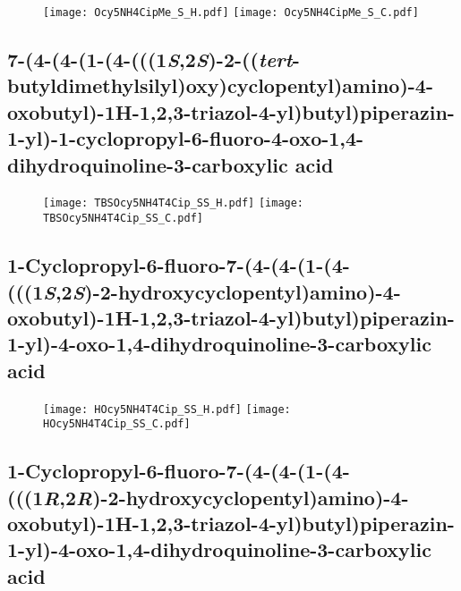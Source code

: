 \begin{figure}[H]
	\centering
		\texttt{[image: Ocy5NH4CipMe\_S\_H.pdf]}
		\texttt{[image: Ocy5NH4CipMe\_S\_C.pdf]}
\end{figure}

\subsection{7\hyp{}(4\hyp{}(4\hyp{}(1\hyp{}(4\hyp{}(((1\textit{S},2\textit{S})\hyp{}2\hyp{}((\textit{tert}\hyp{}butyldimethylsilyl)oxy)cyclopentyl)amino)\hyp{}4\hyp{}oxobutyl)\hyp{}1H\hyp{}1,2,3\hyp{}triazol\hyp{}4\hyp{}yl)butyl)piperazin\hyp{}1\hyp{}yl)\hyp{}1\hyp{}cyclopropyl\hyp{}6\hyp{}fluoro\hyp{}4\hyp{}oxo\hyp{}1,4\hyp{}dihydroquinoline\hyp{}3\hyp{}carboxylic acid }

\begin{figure}[H]
	\centering
		\texttt{[image: TBSOcy5NH4T4Cip\_SS\_H.pdf]}
		\texttt{[image: TBSOcy5NH4T4Cip\_SS\_C.pdf]}
\end{figure}

\subsection{1\hyp{}Cyclopropyl\hyp{}6\hyp{}fluoro\hyp{}7\hyp{}(4\hyp{}(4\hyp{}(1\hyp{}(4\hyp{}(((1\textit{S},2\textit{S})\hyp{}2\hyp{}hydroxycyclopentyl)amino)\hyp{}4\hyp{}oxobutyl)\hyp{}1H\hyp{}1,2,3\hyp{}triazol\hyp{}4\hyp{}yl)butyl)piperazin\hyp{}1\hyp{}yl)\hyp{}4\hyp{}oxo\hyp{}1,4\hyp{}dihydroquinoline\hyp{}3\hyp{}carboxylic acid }

\begin{figure}[H]
	\centering
		\texttt{[image: HOcy5NH4T4Cip\_SS\_H.pdf]}
		\texttt{[image: HOcy5NH4T4Cip\_SS\_C.pdf]}
\end{figure}

\subsection{1\hyp{}Cyclopropyl\hyp{}6\hyp{}fluoro\hyp{}7\hyp{}(4\hyp{}(4\hyp{}(1\hyp{}(4\hyp{}(((1\textit{R},2\textit{R})\hyp{}2\hyp{}hydroxycyclopentyl)amino)\hyp{}4\hyp{}oxobutyl)\hyp{}1H\hyp{}1,2,3\hyp{}triazol\hyp{}4\hyp{}yl)butyl)piperazin\hyp{}1\hyp{}yl)\hyp{}4\hyp{}oxo\hyp{}1,4\hyp{}dihydroquinoline\hyp{}3\hyp{}carboxylic acid }

